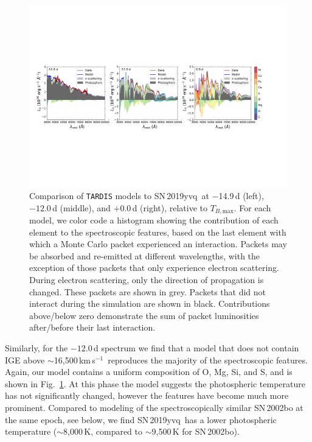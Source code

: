 \documentclass[twocolumn]{aastex63}
\newcommand{\tbmax}{$T_{B,\mathrm{max}}$}
\newcommand{\kms}{km\,s$^{-1}$}
\newcommand{\sn}{SN\,2019yvq}
\begin{document}
\begin{figure}
    \centering
    \includegraphics[width=\textwidth]{./figures/tardis.pdf}
    \caption{Comparison of \texttt{TARDIS} models to \sn\ at $-$14.9\,d
    (left), $-12.0$\,d (middle), and $+$0.0\,d (right), relative to \tbmax.
    For each model, we color code a histogram showing the contribution of
    each element to the spectroscopic features, based on the last element with
    which a Monte Carlo packet experienced an interaction. Packets may be
    absorbed and re-emitted at different wavelengths, with the exception of
    those packets that only experience electron scattering. During electron
    scattering, only the direction of propagation is changed. These packets
    are shown in grey. Packets that did not interact during the simulation are
    shown in black. Contributions above/below zero demonstrate the sum of
    packet luminosities after/before their last interaction.}
    \label{fig:tardis}
\end{figure}

Similarly, for the $-12.0$\,d spectrum we find that a model that does not
contain IGE above $\sim$16,500\,\kms\ reproduces the majority of the
spectroscopic features. Again, our model contains a uniform composition of O,
Mg, Si, and S, and is shown in Fig.~\ref{fig:tardis}. At this phase the model
suggests the photospheric temperature has not significantly changed, however
the features have become much more prominent. Compared to modeling of the
spectroscopically similar SN\,2002bo \citep{Stehle05} at the same epoch, see
below, we find \sn\ has a lower photospheric temperature ($\sim$8,000\,K,
compared to $\sim$9,500\,K for SN\,2002bo).
\end{document}
